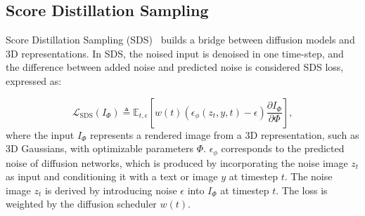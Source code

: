 


\subsection{Score Distillation Sampling}
Score Distillation Sampling (SDS)~\cite{poole2022dreamfusion} builds a bridge between diffusion models and 3D representations. In SDS, the noised input is denoised in one time-step, and the difference between added noise and predicted noise is considered SDS loss, expressed as:

\begin{equation}
    \mathcal{L}_{\text{SDS}}(I_{\Phi}) \triangleq \mathbb{E}_{t,\epsilon} \left[ w(t) \left( \epsilon_{\phi}(z_t, y, t) - \epsilon \right) \frac{\partial I_{\Phi}}{\partial \Phi} \right],
  \label{eq:SDSObservGA}
\end{equation}
where the input $I_{\Phi}$ represents a rendered image from a 3D representation, such as 3D Gaussians, with optimizable parameters $\Phi$. $\epsilon_{\phi}$ corresponds to the predicted noise of diffusion networks, which is produced by incorporating the noise image $z_t$ as input and conditioning it with a text or image $y$ at timestep $t$. The noise image $z_t$ is derived by introducing noise $\epsilon$ into $I_{\Phi}$ at timestep $t$. The loss is weighted by the diffusion scheduler $w(t)$. 
